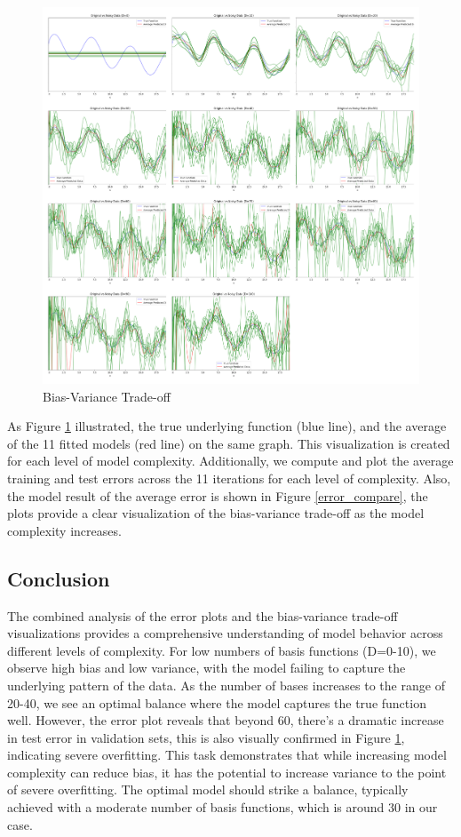 \documentclass{article}
\begin{document}
\begin{figure}[H]
    \centering
    \includegraphics[width=0.9\linewidth,height=0.4\textheight]{figures/bias_variance.jpg} 
    \caption{Bias-Variance Trade-off}
    \label{bias_variance}
\end{figure}

As Figure \ref{bias_variance} illustrated, the true underlying function (blue line), and the average of the 11 fitted models (red line) on the same graph. This visualization is created for each level of model complexity. Additionally, we compute and plot the average training and test errors across the 11 iterations for each level of complexity. Also, the model result of the average error is shown in Figure \ref{error_compare}, the plots provide a clear visualization of the bias-variance trade-off as the model complexity increases. 

\subsection{Conclusion}
The combined analysis of the error plots and the bias-variance trade-off visualizations provides a comprehensive understanding of model behavior across different levels of complexity. For low numbers of basis functions (D=0-10), we observe high bias and low variance, with the model failing to capture the underlying pattern of the data. As the number of bases increases to the range of 20-40, we see an optimal balance where the model captures the true function well. However, the error plot reveals that beyond 60, there's a dramatic increase in test error in validation sets, this is also visually confirmed in Figure \ref{bias_variance}, indicating severe overfitting. This task demonstrates that while increasing model complexity can reduce bias, it has the potential to increase variance to the point of severe overfitting. The optimal model should strike a balance, typically achieved with a moderate number of basis functions, which is around 30 in our case.
\end{document}
